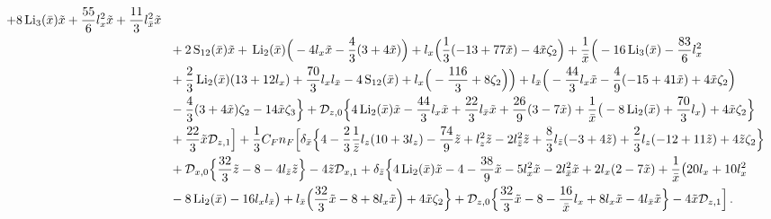 \begin{align}
        +8 \lithxbar \xt
        +\frac{55}{6}  \logx^2 \xt
        +\frac{11}{3}  \logxbar^2 \xt
\nn\\&~~        
        +2 \sotxbar \xt
        +\litwxbar \Big(
                -4 \logx \xt
                -\frac{4}{3} (3+4 \xt)
        \Big)
        +\logx \Big(
                \frac{1}{3} (-13+77 \xt)
                -4 \xt \zeta_2
        \Big)
        +\iomx \Big(
                -16 \lithxbar
                -\frac{83}{6} \logx^2
\nn\\&~~
                +\frac{2}{3} \litwxbar (13+12 \logx)
                +\frac{70}{3}  \logx \logxbar
                -4 \sotxbar
                +\logx \Big(
                        -\frac{116}{3}
                        +8 \zeta_2
                \Big)
        \Big)
        +\logxbar \Big(
                -\frac{44}{3}  \logx \xt
                -\frac{4}{9} (-15+41 \xt)
                +4 \xt \zeta_2
        \Big)
\nn\\&~~        
        -\frac{4}{3} (3+4 \xt) \zeta_2
        -14 \xt \zeta_3
\Big\}
+  {\mathcal{D}_{z,0}}  \Big\{
        4 \litwxbar \xt
        -\frac{44}{3}  \logx \xt
        +\frac{22}{3}  \logxbar \xt
        +\frac{26}{9} (3-7 \xt)
        +\iomx \big(
                -8 \litwxbar
                +\frac{70}{3} \logx
        \big)
        +4 \xt \zeta_2
\Big\} 
% 
\nn\\&~~        
+\frac{22}{3} \xt  {\mathcal{D}_{z,1}} 
% 
\Big]
% 
+ \frac{1}{3} C_F n_F \Big[
% 
\delta_{\bar{x}} \Big\{
        4
        -\frac{2}{3} \iomz \logz (10+3 \logz)
        -\frac{74}{9}  \zt
        +\logz^2 \zt
        -2 \logzbar^2 \zt
        +\frac{8}{3} \logzbar (-3+4 \zt)
        +\frac{2}{3} \logz (-12+11 \zt)
        +4 \zt \zeta_2
\Big\}
% 
\nn\\&~~
% 
+  {\mathcal{D}_{x,0}} \Big\{
         \frac{32}{3}  \zt
        -8
        -4 \logzbar \zt
\Big\} 
% 
-4 \zt {\mathcal{D}_{x,1}}
% 
+\delta_{\zb} \Big\{
         4 \litwxbar \xt
        -4
        -\frac{38}{9} \xt
        -5 \logx^2 \xt
        -2 \logxbar^2 \xt
        +2 \logx (2-7 \xt)
%        
        +\iomx \big(
                 20 \logx
                +10 \logx^2
\nn\\&~~                 
                -8 \litwxbar
                -16 \logx \logxbar
        \big)
        +\logxbar \Big(
                 \frac{32}{3} \xt
                -8
                +8 \logx \xt
        \Big)
        +4 \xt \zeta_2
\Big\}
% 
+  {\mathcal{D}_{z,0}} \Big\{
         \frac{32}{3} \xt
        -8
        -\frac{16}{\xb}   \logx
        +8 \logx \xt
        -4 \logxbar \xt
\Big\} 
-4 \xt   {\mathcal{D}_{z,1}} 
% 
\Big]  \,.
\end{align}
% 
